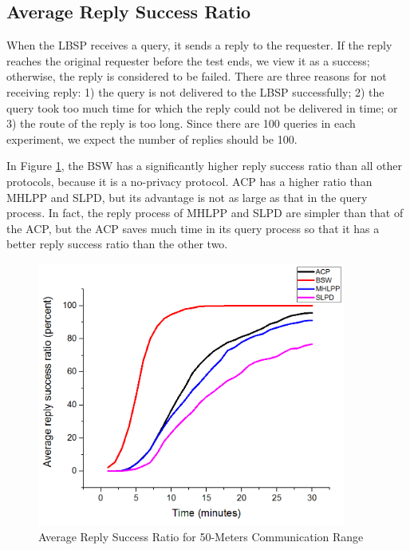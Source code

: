 \subsection{ Average Reply Success Ratio}

\noindent When the LBSP receives a query, it sends a reply to the requester. If the reply reaches the original requester before the test ends, we view it as a success; otherwise, the reply is considered to be failed. There are three reasons for not receiving reply: 1) the query is not delivered to the LBSP successfully; 2) the query took too much time for which the reply could not be delivered in time; or 3) the route of the reply is too long. Since there are 100 queries in each experiment, we expect the number of replies should be 100. 

In Figure \ref{fig:F417AverageReplySuccessRatioWith50MetersCommunicationRatio}, the BSW has a significantly higher reply success ratio than all other protocols, because it is a no-privacy protocol. ACP has a higher ratio than MHLPP and SLPD, but its advantage is not as large as that in the query process. In fact, the reply process of MHLPP and SLPD are simpler than that of the ACP, but the ACP saves much time in its query process so that it has a better reply success ratio than the other two.

\begin{figure} [hbtp]
\centering 
\includegraphics[width=4.0in]{figures/F417AverageReplySuccessRatioWith50MetersCommunicationRatio.png}
\caption{Average Reply Success Ratio for 50-Meters Communication Range} 
\label{fig:F417AverageReplySuccessRatioWith50MetersCommunicationRatio} %
\end{figure}


